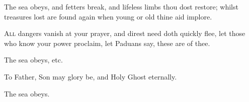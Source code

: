 \begin{enpars}
\rr The sea obeys, and fetters break, and lifeless limbs thou dost restore; whilst treasures lost are found again when young or old thine aid implore.


\lettrine{A}{ll} dangers vanish at your prayer,
and direst need doth quickly flee,
let those who know your power proclaim, 
let Paduans say, these are of thee.

\rr The sea obeys, etc.


To Father, Son may glory be,
and Holy Ghost eternally.

\rr The sea obeys.
\end{enpars}


